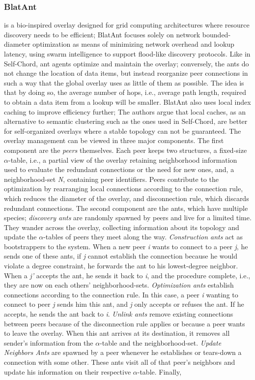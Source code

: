 \documentclass[runningheads]{llncs}
\begin{document}
\subsubsection{BlatAnt}\cite{blatant} is a bio-inspired overlay designed for grid computing architectures where resource discovery needs to be efficient; BlatAnt focuses solely on network bounded-diameter optimization as means of minimizing network overhead and lookup latency, using swarm intelligence to support flood-like discovery protocols. Like in Self-Chord, ant agents optimize and maintain the overlay; conversely, the ants do not change the location of data items, but instead reorganize peer connections in such a way that the global overlay uses as little of them as possible. The idea is that by doing so, the average number of hops, i.e., average path length, required to obtain a data item from a lookup will be smaller. BlatAnt also uses local index caching to improve efficiency further; The authors argue that local caches, as an alternative to semantic clustering such as the ones used in Self-Chord, are better for self-organized overlays where a stable topology can not be guaranteed. The overlay management can be viewed in three major components. The first component are the \textit{peers} themselves. Each peer keeps two structures, a fixed-size $\alpha$-table, i.e., a partial view of the overlay retaining neighborhood information used to evaluate the redundant connections or the need for new ones, and, a neighborhood-set \textit{N}, containing peer identifiers. Peers contribute to the optimization by rearranging local connections according to the connection rule, which reduces the diameter of the overlay, and disconnection rule, which discards redundant connections. The second component are the ants, which have multiple species; \textit{discovery ants} are randomly spawned by peers and live for a limited time. They wander across the overlay, collecting information about its topology and update the $\alpha$-tables of peers they meet along the way. \textit{Construction ants} act as bootstrappers to the system. When a new peer \textit{i} wants to connect to a peer \textit{j}, he sends one of these ants, if \textit{j} cannot establish the connection because he would violate a degree constraint, he forwards the ant to his lowest-degree neighbor. When a \textit{j'} accepts the ant, he sends it back to \textit{i}, and the procedure complete, i.e., they are now on each others' neighborhood-sets. \textit{Optimization ants} establish connections according to the connection rule. In this case, a peer \textit{i} wanting to connect to peer \textit{j} sends him this ant, and \textit{j} only accepts or refuses the ant. If he accepts, he sends the ant back to \textit{i}. \textit{Unlink ants} remove existing connections between peers because of the disconnection rule applies or because a peer wants to leave the overlay. When this ant arrives at its destination, it removes all sender's information from the $\alpha$-table and the neighborhood-set. \textit{Update Neighbors Ants} are spawned by a peer whenever he establishes or tears-down a connection with some other. These ants visit all of that peer's neighbors and update his information on their respective $\alpha$-table. Finally, 
\end{document}
